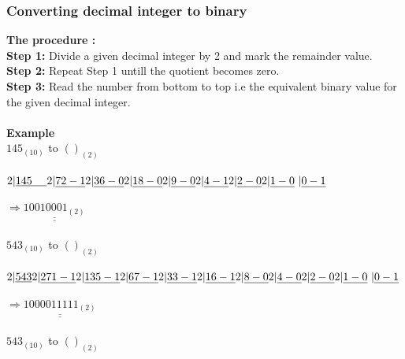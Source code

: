 \documentclass{article}
\begin{document}
	\subsubsection{Converting decimal integer to binary}
	\textbf{The procedure :} \\
	\textbf{Step 1:} Divide a given decimal integer by 2 and mark the remainder value.\\
	\textbf{Step 2:} Repeat Step 1 untill the quotient becomes zero.\\
	\textbf{Step 3:} Read the number from bottom to top i.e the equivalent binary value for the given decimal integer.
	\\ \\
	\textbf{Example} \\
	$ 145_{(10)} $ to $ ()_{(2)} $
	\\ \\
	$2|\underline{145 ~~~~} \\
	 2|\underline{72 - 1} \\
	 2|\underline{36 - 0} \\
	 2|\underline{18 - 0} \\
	 2|\underline{9 - 0} \\
	 2|\underline{4 - 1} \\
	 2|\underline{2 - 0} \\
	 2|\underline{1 - 0} \\
	 {~}|\underline{0 - 1} $
	 \\ \\
	 $ \Longrightarrow \underline{\underline{10010001_{(2)}}} $ 
	 \\ \\
	 $ 543_{(10)} $ to $ ()_{(2)} $
	 \\ \\
	 $2|\underline{543} \\
	 2|\underline{271 - 1} \\
	 2|\underline{135 - 1} \\
	 2|\underline{67 - 1} \\
	 2|\underline{33 - 1} \\
	 2|\underline{16 - 1} \\
	 2|\underline{8 - 0} \\
	 2|\underline{4 - 0} \\
	 2|\underline{2 - 0} \\
	 2|\underline{1 - 0} \\
	 {~}|\underline{0 - 1} 
	 $
	 \\ \\
	 $ \Longrightarrow \underline{\underline{1000011111_{(2)}}} $
	 \\ \\
	 $ 543_{(10)} $ to $ ()_{(2)} $
\end{document}

